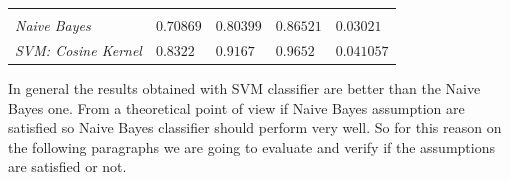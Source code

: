 \documentclass[11pt,a4paper]{article}
\begin{document}
\begin{table}[!htbp]
	\begin{tabularx}{\linewidth}{|Y|l|l|l|l|}
		 &  &  &  &   \\
		\centering \textit{Naive Bayes} & $0.70869$ & $0.80399$ & $0.86521$ &   $0.03021$\\
		
		\centering \textit{SVM: Cosine Kernel} & $0.8322$ & $0.9167$ & $0.9652$ & $0.041057$\\
	\end{tabularx}
\end{table}

In general the results obtained with SVM classifier are better than the Naive Bayes one. From a theoretical point of view if Naive Bayes assumption are satisfied so Naive Bayes classifier should perform very well. So for this reason on the following paragraphs we are going to evaluate and verify if the assumptions are satisfied or not.
\end{document}
